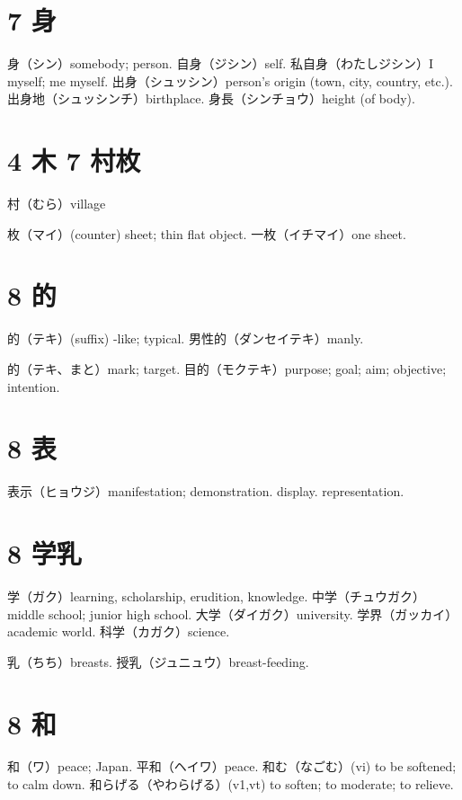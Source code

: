 \section{7 身}

身（シン）somebody; person.
自身（ジシン）self.
私自身（わたしジシン）I myself; me myself.
出身（シュッシン）person's origin (town, city, country, etc.).
出身地（シュッシンチ）birthplace.
身長（シンチョウ）height (of body).

\section{4 木 7 村枚}

村（むら）village

枚（マイ）(counter) sheet; thin flat object.
一枚（イチマイ）one sheet.

\section{8 的}

的（テキ）(suffix) -like; typical.
男性的（ダンセイテキ）manly.

的（テキ、まと）mark; target.
目的（モクテキ）purpose; goal; aim; objective; intention.

\section{8 表}

表示（ヒョウジ）manifestation; demonstration. display. representation.

\section{8 学乳}

学（ガク）learning, scholarship, erudition, knowledge.
中学（チュウガク）middle school; junior high school.
大学（ダイガク）university.
学界（ガッカイ）academic world.
科学（カガク）science.

乳（ちち）breasts.
授乳（ジュニュウ）breast-feeding.

\section{8 和}

和（ワ）peace; Japan.
平和（ヘイワ）peace.
和む（なごむ）(vi) to be softened; to calm down.
和らげる（やわらげる）(v1,vt) to soften; to moderate; to relieve.

